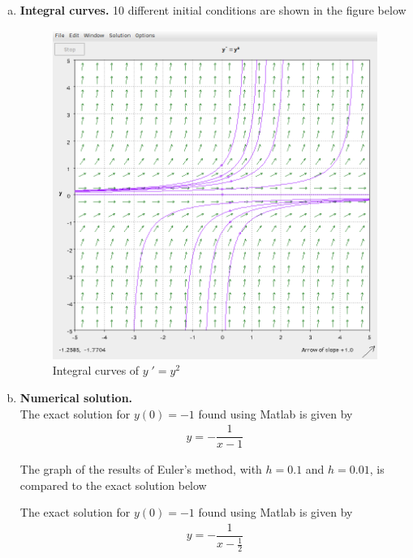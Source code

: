 \documentclass[a4paper,12pt]{article}
\begin{document}
\begin{enumerate}[I.]
\begin{enumerate}[a)]
    \item \textbf{Integral curves.} 10 different initial conditions are shown in the figure below
        \begin{figure}[H]
      \begin{center}
        \includegraphics[scale=.3]{22.png}
        \caption{Integral curves of $y\;' = y^2$}
        \label{fig:4}
      \end{center}
    \end{figure}
    \item \textbf{Numerical solution.} \\

      The exact solution for $y(0)=-1$ found using Matlab is given by
      \begin{align*}
        y=- \dfrac{1}{x-1}
      \end{align*}

      The graph of the results of Euler's method, with $h=0.1$ and $h=0.01$, is compared to the exact solution below
      
            
      The exact solution for $y(0)=-1$ found using Matlab is given by
      \begin{align*}
        y=-\dfrac{1}{x - \frac{1}{2}}
      \end{align*}


\end{enumerate}
\end{enumerate}
\end{document}
